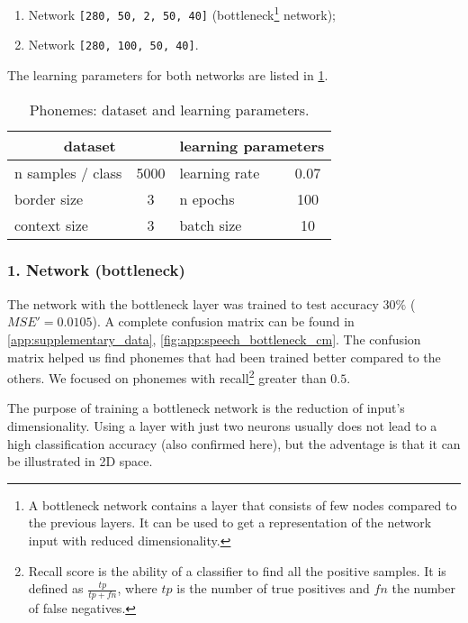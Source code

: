 \begin{enumerate}
\item Network \texttt{[280, 50, 2, 50, 40]} (bottleneck\footnote{A bottleneck network contains a layer that consists of few nodes compared to the previous layers. It can be used to get a representation of the network input with reduced dimensionality.} network);
\item Network \texttt{[280, 100, 50, 40]}.
\end{enumerate}

The learning parameters for both networks are listed in \cref{tab:examples:speech_learning_parameters}.

\begin{table}[H]
\centering
\begin{tabular}{|l|c|l|c|}
\hline
\multicolumn{2}{|c|}{dataset} & \multicolumn{2}{c|}{learning parameters} \\ \hline
n samples / class    & 5000   & learning rate            & 0.07          \\ \hline
border size          & 3      & n epochs                 & 100           \\ \hline
context size         & 3      & batch size               & 10            \\ \hline
\end{tabular}
\caption{Phonemes: dataset and learning parameters.}
\label{tab:examples:speech_learning_parameters}
\end{table}

\subsubsection*{1. Network (bottleneck)}
The network with the bottleneck layer was trained to test accuracy $ 30\% $ ($ MSE' = 0.0105 $). A complete confusion matrix can be found in \cref{app:supplementary_data}, \cref{fig:app:speech_bottleneck_cm}. The confusion matrix helped us find phonemes that had been trained better compared to the others. We focused on phonemes with recall\footnote{Recall score is the ability of a classifier to find all the positive samples. It is defined as $ \frac{tp}{tp+fn} $, where $ tp $ is the number of true positives and $ fn $ the number of false negatives.} greater than $ 0.5 $.

The purpose of training a bottleneck network is the reduction of input's dimensionality. Using a layer with just two neurons usually does not lead to a high classification accuracy (also confirmed here), but the adventage is that it can be illustrated in 2D space.

